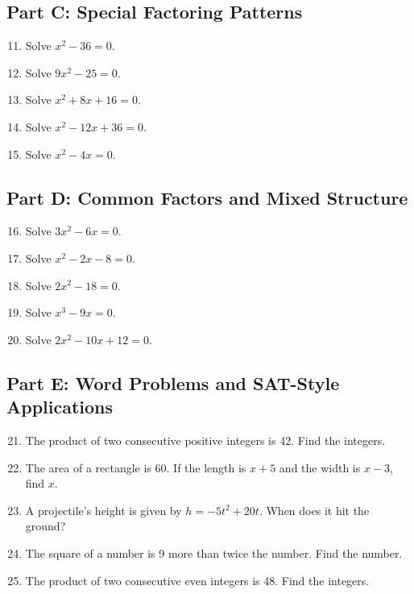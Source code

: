 \documentclass[12pt]{article}
\begin{document}
\subsection*{Part C: Special Factoring Patterns}
\begin{enumerate}
  \setcounter{enumi}{10}
  \item Solve \(x^2 - 36 = 0.\)
  \item Solve \(9x^2 - 25 = 0.\)
  \item Solve \(x^2 + 8x + 16 = 0.\)
  \item Solve \(x^2 - 12x + 36 = 0.\)
  \item Solve \(x^2 - 4x = 0.\)
\end{enumerate}

\subsection*{Part D: Common Factors and Mixed Structure}
\begin{enumerate}
  \setcounter{enumi}{15}
  \item Solve \(3x^2 - 6x = 0.\)
  \item Solve \(x^2 - 2x - 8 = 0.\)
  \item Solve \(2x^2 - 18 = 0.\)
  \item Solve \(x^3 - 9x = 0.\)
  \item Solve \(2x^2 - 10x + 12 = 0.\)
\end{enumerate}

\subsection*{Part E: Word Problems and SAT-Style Applications}
\begin{enumerate}
  \setcounter{enumi}{20}
  \item The product of two consecutive positive integers is 42. Find the integers.
  \item The area of a rectangle is 60. If the length is \(x + 5\) and the width is \(x - 3\), find \(x.\)
  \item A projectile’s height is given by \(h = -5t^2 + 20t.\) When does it hit the ground?
  \item The square of a number is 9 more than twice the number. Find the number.
  \item The product of two consecutive even integers is 48. Find the integers.
\end{enumerate}

\newpage
\end{document}
